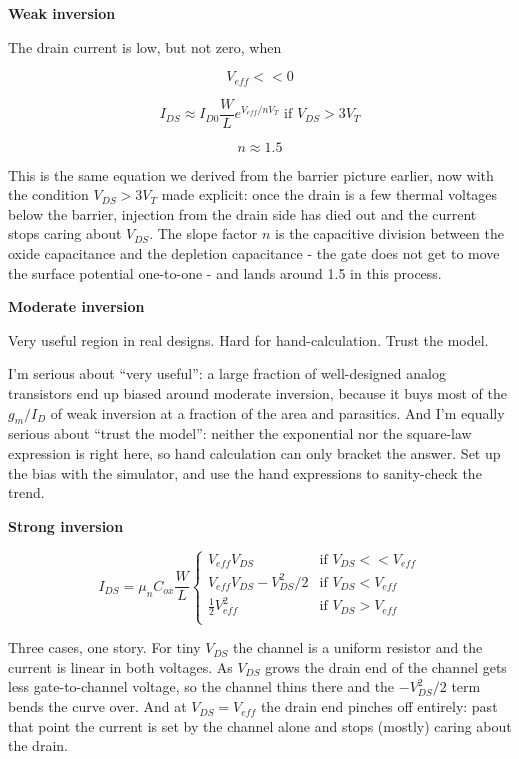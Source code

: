 \textbf{Weak inversion}

The drain current is low, but not zero, when

\[ V_{eff} << 0 \]

\[ I_{DS} \approx I_{D0} \frac{W}{L} e^{V_{eff}/n V_{T}} \text{  if } V_{DS} > 3 V_{T}  \]

\[ n \approx 1.5 \]

This is the same equation we derived from the barrier picture earlier,
now with the condition \(V_{DS} > 3V_T\) made explicit: once the drain
is a few thermal voltages below the barrier, injection from the drain
side has died out and the current stops caring about \(V_{DS}\). The
slope factor \(n\) is the capacitive division between the oxide
capacitance and the depletion capacitance - the gate does not get to
move the surface potential one-to-one - and lands around 1.5 in this
process.

\textbf{Moderate inversion}

Very useful region in real designs. Hard for hand-calculation. Trust the
model.

I'm serious about ``very useful'': a large fraction of well-designed
analog transistors end up biased around moderate inversion, because it
buys most of the \(g_m/I_D\) of weak inversion at a fraction of the area
and parasitics. And I'm equally serious about ``trust the model'':
neither the exponential nor the square-law expression is right here, so
hand calculation can only bracket the answer. Set up the bias with the
simulator, and use the hand expressions to sanity-check the trend.

\textbf{Strong inversion}

\[
I_{DS} = \mu_n C_{ox} \frac{W}{L} 
\begin{cases}
V_{eff} V_{DS} & \text{if }V_{DS} << V_{eff} \\[15pt]
V_{eff} V_{DS} - V_{DS}^2/2
& \text{if }  V_{DS} < V_{eff}  \\[15pt]
\frac{1}{2} V_{eff}^2
& \text{if }  V_{DS} > V_{eff} \\[15pt]
\end{cases}
\]

Three cases, one story. For tiny \(V_{DS}\) the channel is a uniform
resistor and the current is linear in both voltages. As \(V_{DS}\) grows
the drain end of the channel gets less gate-to-channel voltage, so the
channel thins there and the \(-V_{DS}^2/2\) term bends the curve over.
And at \(V_{DS} = V_{eff}\) the drain end pinches off entirely: past
that point the current is set by the channel alone and stops (mostly)
caring about the drain.

